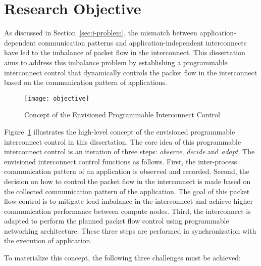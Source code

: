 \clearpage

\section{Research Objective}\label{sec:i-objective}

As discussed in Section~\ref{sec:i-problem}, the mismatch between
application-dependent communication patterns and application-independent
interconnects have led to the imbalance of packet flow in the interconnect.
This dissertation aims to address this imbalance problem by establishing a
programmable interconnect control that dynamically controls the packet flow in
the interconnect based on the communication pattern of applications.

\begin{figure}
    \centering
    \texttt{[image: objective]}
    \caption{Concept of the Envisioned Programmable Interconnect Control}%
    \label{fig:objective}
\end{figure}

Figure~\ref{fig:objective} illustrates the high-level concept of the
envisioned programmable interconnect control in this dissertation. The core
idea of this programmable interconnect control is an iteration of three steps:
\emph{observe}, \emph{decide} and \emph{adapt}. The envisioned interconnect
control functions as follows. First, the inter-process communication pattern
of an application is observed and recorded. Second, the decision on how to
control the packet flow in the interconnect is made based on the collected
communication pattern of the application. The goal of this packet flow control
is to mitigate load imbalance in the interconnect and achieve higher
communication performance between compute nodes. Third, the interconnect is
adapted to perform the planned packet flow control using programmable
networking architecture. These three steps are performed in synchronization
with the execution of application.

To materialize this concept, the following three challenges must be achieved:

